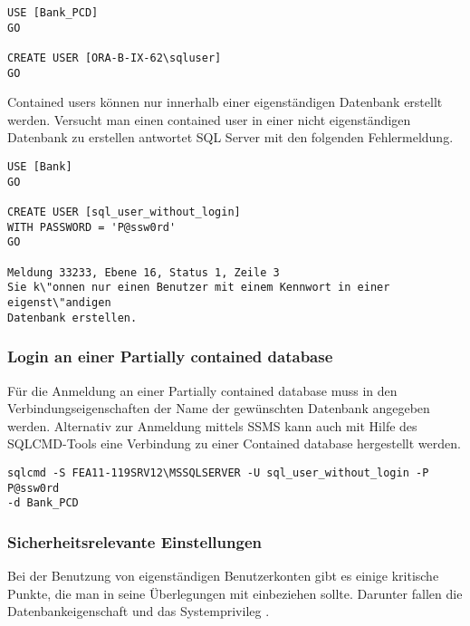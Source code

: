             \begin{lstlisting}[language=ms_sql,caption={Erstellen
            eines Windows-Benutzers},label=sql20_05]
USE [Bank_PCD]
GO

CREATE USER [ORA-B-IX-62\sqluser]
GO
            \end{lstlisting}
            Contained users können nur innerhalb einer eigenständigen Datenbank
            erstellt werden. Versucht man einen contained user in einer nicht
            eigenständigen Datenbank zu erstellen antwortet SQL Server mit den
            folgenden Fehlermeldung.
            \begin{lstlisting}[language=ms_sql,caption={Fehler beim Erstellen
            eines SQL Benutzers mit Kennwort in einer nicht
            eigenständigen Datenbank},label=sql20_06]
USE [Bank]
GO

CREATE USER [sql_user_without_login]
WITH PASSWORD = 'P@ssw0rd'
GO

Meldung 33233, Ebene 16, Status 1, Zeile 3
Sie k\"onnen nur einen Benutzer mit einem Kennwort in einer eigenst\"andigen 
Datenbank erstellen.
            \end{lstlisting}
          \subsubsection{Login an einer Partially contained database}
            Für die Anmeldung an einer Partially contained database muss in den
            Verbindungseigenschaften der Name der gewünschten Datenbank
            angegeben werden.
            Alternativ zur Anmeldung mittels SSMS kann auch mit Hilfe des
            SQLCMD-Tools eine Verbindung zu einer Contained database hergestellt
            werden.
            \begin{lstlisting}[language=terminal,caption={Login an einer
            Partially contained database mit dem SQLCMD-Tool},label=sql20_07]
sqlcmd -S FEA11-119SRV12\MSSQLSERVER -U sql_user_without_login -P P@ssw0rd
-d Bank_PCD
            \end{lstlisting}
            \begin{literaturinternet}
              \item \cite{bmmcspb202ss2pcdp1}
              \item \cite{hh534404}
            \end{literaturinternet}
          \subsubsection{Sicherheitsrelevante Einstellungen}  
            Bei der Benutzung von eigenständigen Benutzerkonten gibt es einige
            kritische Punkte, die man in seine Überlegungen mit einbeziehen
            sollte. Darunter fallen die Datenbankeigenschaft
             und das Systemprivileg .
            
